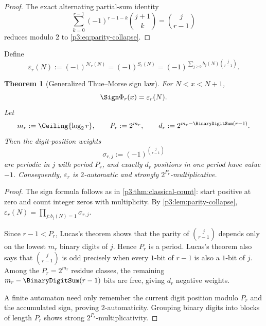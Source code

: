 \documentclass[11pt,oneside]{article}
\newtheorem{theorem}{Theorem}[section]
\theoremstyle{definition}
\theoremstyle{remark}
\begin{document}
\begin{proof}
The exact alternating partial-sum identity
\[
 \sum_{k=0}^{r-1}(-1)^{r-1-k}\binom{j+1}{k}=\binom j{r-1}
\]
reduces modulo $2$ to \eqref{p3:eq:parity-collapse}.
\end{proof}

\begin{definition}\label{p3:def:eps-r}
Define
\begin{equation}\label{p3:eq:eps-r}
 \varepsilon_r(N):=(-1)^{\mathcal N_r(N)}
 =(-1)^{S_r(N)}
 =(-1)^{\sum_{j\ge0}b_j(N)\binom j{r-1}}.
\end{equation}
\end{definition}

\begin{theorem}[Generalized Thue--Morse sign law]\label{p3:thm:sign-law-r}
For $N<x<N+1$,
\begin{equation}\label{p3:eq:sign-law-r}
  \Sign\Phi_r(x)=\varepsilon_r(N).
\end{equation}
Let
\begin{equation}\label{p3:eq:Pr-dr}
 m_r:=\Ceiling{\log_2r},\qquad
 P_r:=2^{m_r},\qquad
 d_r:=2^{m_r-\BinaryDigitSum(r-1)}.
\end{equation}
Then the digit-position weights
\begin{equation}\label{p3:eq:sigma-rj}
 \sigma_{r,j}:=(-1)^{\binom j{r-1}}
\end{equation}
are periodic in $j$ with period $P_r$, and exactly $d_r$ positions in one period have value $-1$.  Consequently, $\varepsilon_r$ is $2$-automatic and strongly $2^{P_r}$-multiplicative.
\end{theorem}

\begin{proof}
The sign formula follows as in \cref{p3:thm:classical-count}: start positive at zero and count integer zeros with multiplicity.  By \cref{p3:lem:parity-collapse},
$\varepsilon_r(N)=\prod_{j:b_j(N)=1}\sigma_{r,j}$.

Since $r-1<P_r$, Lucas's theorem shows that the parity of $\binom j{r-1}$ depends only on the lowest $m_r$ binary digits of $j$.  Hence $P_r$ is a period.  Lucas's theorem also says that $\binom j{r-1}$ is odd precisely when every $1$-bit of $r-1$ is also a $1$-bit of $j$.  Among the $P_r=2^{m_r}$ residue classes, the remaining $m_r-\BinaryDigitSum(r-1)$ bits are free, giving $d_r$ negative weights.

A finite automaton need only remember the current digit position modulo $P_r$ and the accumulated sign, proving $2$-automaticity.  Grouping binary digits into blocks of length $P_r$ shows strong $2^{P_r}$-multiplicativity.
\end{proof}
\end{document}
